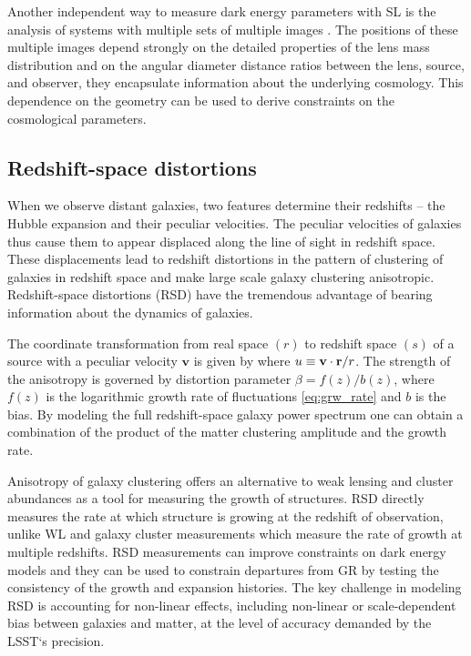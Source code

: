 Another independent way to measure dark energy parameters with SL is the analysis of systems with multiple sets of multiple images \textcite{SL_in_CLGs}. The positions of these multiple images depend strongly on the detailed properties of the lens mass distribution and on the angular diameter distance ratios between the lens, source, and observer, they encapsulate information about the underlying cosmology. This dependence on the geometry can be used to derive constraints on the cosmological parameters.
\subsection{Redshift-space distortions}
\label{sec:rsd}
When we observe distant galaxies, two features determine their redshifts -- the Hubble expansion and their peculiar velocities. The peculiar velocities of galaxies thus cause them to appear displaced along the line of sight in redshift space. These displacements lead to redshift distortions in the pattern of clustering of galaxies in redshift space and make large scale galaxy clustering anisotropic. Redshift-space distortions (RSD) have the tremendous advantage of bearing information about the dynamics of galaxies.

The coordinate transformation from real space $(r)$ to redshift space $(s)$ of a source with a peculiar velocity $\bm v$ is given by
where $u\equiv\mathbf v\cdot\mathbf r/r$. The strength of the anisotropy is governed by distortion parameter $\beta = f(z)/b(z)$, where $f(z)$ is the logarithmic growth rate of fluctuations \eqref{eq:grw_rate} and $b$ is the bias. By modeling the full redshift-space galaxy power spectrum one can obtain a combination of the product of the matter clustering amplitude and the growth rate.

Anisotropy of galaxy clustering offers an alternative to weak lensing and cluster abundances as a tool for measuring the growth of structures. RSD directly measures the rate at which structure is growing at the redshift of observation, unlike WL and galaxy cluster measurements which measure the rate of growth at multiple redshifts. RSD measurements can improve constraints on dark energy models and they can be used to constrain departures from GR by testing the consistency of the growth and expansion histories. The key challenge in modeling RSD is accounting for non-linear effects, including non-linear or scale-dependent bias between galaxies and matter, at the level of accuracy demanded by the LSST`s precision.